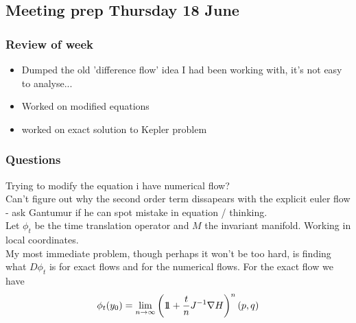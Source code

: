 \documentclass[12pt]{article}
\begin{document}
\subsection{Meeting prep Thursday 18 June}
\subsubsection{Review of week}
\begin{itemize}
    \item Dumped the old 'difference flow' idea I had been working with, it's not easy to analyse...
    \item Worked on modified equations
    \item worked on exact solution to Kepler problem
\end{itemize}

\subsubsection{Questions}
Trying to modify the equation i have numerical flow? \\

Can't figure out why the second order term dissapears with the explicit euler flow - ask Gantumur if he can spot mistake in equation / thinking.\\

Let $\phi_t$ be the time translation operator and $M$ the invariant manifold. Working in local coordinates.\\

My most immediate problem, though perhaps it won't be too hard, is finding what $D\phi_t$ is for exact flows and for the numerical flows. For the exact flow we have 
$$\phi_t(y_0) = 
\lim_{n\to\infty} \left( 1\!\!1 + \frac{t}{n}J^{-1}\nabla H \right)^n (p,q)
$$
\end{document}
